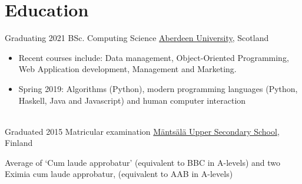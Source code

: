 \documentclass[letterpaper]{twentysecondcv} %
\begin{document}
\makeprofile %

\section{Education}
\begin{twenty}
    \twentyitem
        {Graduating}
        {2021}
        {BSc. Computing Science}
        {\href{https://www.abdn.ac.uk/}{Aberdeen University}, Scotland}
        {}
            {
            \begin{itemize}
                \item Recent courses include: Data management, Object-Oriented Programming, Web Application development, Management and Marketing.
                \item Spring 2019: Algorithms (Python), modern programming languages (Python, Haskell, Java and Javascript) and human computer interaction
            \end{itemize}
}\\
\twentyitem
{Graduated}
{2015}
{Matricular examination}
{\href{https://www.abdn.ac.uk/}{Mäntsälä Upper Secondary School}, Finland}
{}
    {
    Average of ‘Cum laude approbatur’ (equivalent to BBC in A-levels) and two Eximia cum lau­de ap­pro­ba­tur, (equivalent to AAB in A-levels)

     }
\end{twenty}
\end{document}
